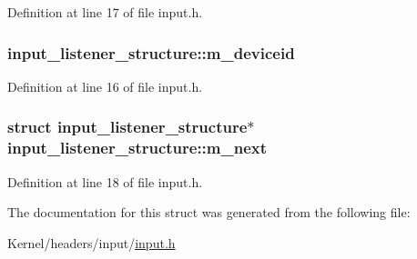 Definition at line 17 of file input.h.

\hypertarget{structinput__listener__structure_a21758f6b8e1d90056b68757c4880124a}{
\subsubsection[{m\_\-deviceid}]{ {\bf input\_\-listener\_\-structure::m\_\-deviceid}}}
\label{structinput__listener__structure_a21758f6b8e1d90056b68757c4880124a}


Definition at line 16 of file input.h.

\hypertarget{structinput__listener__structure_a504494642fba1478dc9cfac0fe6c9692}{
\subsubsection[{m\_\-next}]{\setlength{\rightskip}{0pt plus 5cm}struct {\bf input\_\-listener\_\-structure}$\ast$ {\bf input\_\-listener\_\-structure::m\_\-next}}}
\label{structinput__listener__structure_a504494642fba1478dc9cfac0fe6c9692}


Definition at line 18 of file input.h.



The documentation for this struct was generated from the following file:\begin{DoxyCompactItemize}
\item 
Kernel/headers/input/\hyperlink{input_8h}{input.h}\end{DoxyCompactItemize}
